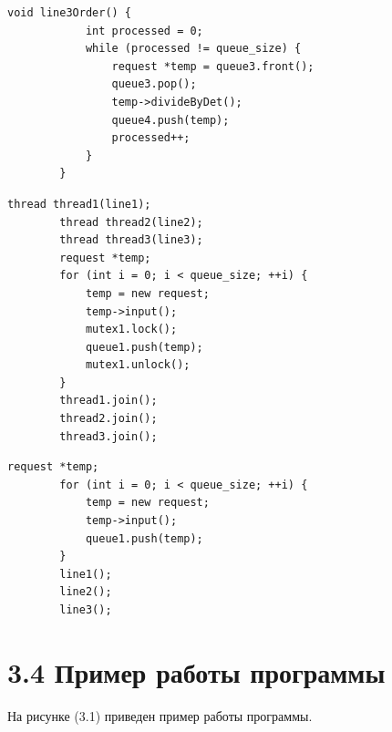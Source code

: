 \documentclass[12pt, a4paper]{report}
\begin{document}
	\begin{lstlisting}[title=Листинг 3.9~--- Функция третьей ленты последовательного конвейера]
		void line3Order() {
			int processed = 0;
			while (processed != queue_size) {
				request *temp = queue3.front();
				queue3.pop();
				temp->divideByDet();
				queue4.push(temp);
				processed++;
			}
		}
	\end{lstlisting}
	\newpage
	\begin{lstlisting}[title=Листинг 3.10~--- Параллельный конвейер]
		thread thread1(line1);
		thread thread2(line2);
		thread thread3(line3);
		request *temp;
		for (int i = 0; i < queue_size; ++i) {
			temp = new request;
			temp->input();
			mutex1.lock();
			queue1.push(temp);
			mutex1.unlock();
		}
		thread1.join();
		thread2.join();
		thread3.join();
	\end{lstlisting}
	
	\begin{lstlisting}[title=Листинг 3.11~--- Последовательный конвейер]
		request *temp;
		for (int i = 0; i < queue_size; ++i) {
			temp = new request;
			temp->input();
			queue1.push(temp);
		}
		line1();
		line2();
		line3();
	\end{lstlisting}
	\newpage
	\section*{3.4 Пример работы программы}
	
	На рисунке (3.1) приведен пример работы программы.
	
\end{document}
